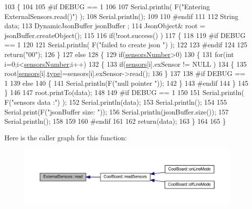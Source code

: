 \begin{DoxyCode}
103 \{
104 
105 \textcolor{preprocessor}{#if DEBUG == 1}
106 
107     Serial.println( F(\textcolor{stringliteral}{"Entering ExternalSensors.read()"}) );
108     Serial.println();
109 
110 \textcolor{preprocessor}{#endif }
111 
112     String data;
113     DynamicJsonBuffer  jsonBuffer ;
114     JsonObject& root = jsonBuffer.createObject();
115 
116     \textcolor{keywordflow}{if}(!root.success() )
117     \{
118  
119 \textcolor{preprocessor}{    #if DEBUG == 1}
120 
121         Serial.println( F(\textcolor{stringliteral}{"failed to create json "}) );
122     
123 \textcolor{preprocessor}{    #endif }
124 
125         \textcolor{keywordflow}{return}(\textcolor{stringliteral}{"00"});
126     \}
127     \textcolor{keywordflow}{else}
128     \{
129         \textcolor{keywordflow}{if}(\hyperlink{class_external_sensors_a58e4fbf9adeae787d92be5fa33043b5d}{sensorsNumber}>0)
130         \{
131             \textcolor{keywordflow}{for}(\textcolor{keywordtype}{int} i=0;i<\hyperlink{class_external_sensors_a58e4fbf9adeae787d92be5fa33043b5d}{sensorsNumber};i++)
132             \{
133                 \textcolor{keywordflow}{if}(\hyperlink{class_external_sensors_a284233f884fcf00154a44740cf1d9e1e}{sensors}[i].exSensor != NULL )
134                 \{
135                     root[\hyperlink{class_external_sensors_a284233f884fcf00154a44740cf1d9e1e}{sensors}[i].\hyperlink{struct_external_sensors_1_1sensor_a6acfdb02c742c2110d7bd2b5d9fce9e7}{type}]=sensors[i].exSensor->read();       
136                 \}
137             
138 \textcolor{preprocessor}{            #if DEBUG == 1}
139                 \textcolor{keywordflow}{else}
140                 \{
141                     Serial.println(F(\textcolor{stringliteral}{"null pointer "}));
142                 \}
143 \textcolor{preprocessor}{            #endif  }
144             \}
145         \}   
146         
147         root.printTo(data);
148     
149 \textcolor{preprocessor}{    #if DEBUG == 1}
150 
151         Serial.println( F(\textcolor{stringliteral}{"sensors data :"}) );
152         Serial.println(data);
153         Serial.println();
154 
155         Serial.print(F(\textcolor{stringliteral}{"jsonBuffer size: "}));
156         Serial.println(jsonBuffer.size());
157         Serial.println();
158 
159     
160 \textcolor{preprocessor}{    #endif}
161     
162         \textcolor{keywordflow}{return}(data);
163     \}
164 
165 \}
\end{DoxyCode}
Here is the caller graph for this function\+:\nopagebreak
\begin{figure}[H]
\begin{center}
\leavevmode
\includegraphics[width=350pt]{d1/d2f/class_external_sensors_a53177b81eca3be89508b5511ddcd00fc_icgraph}
\end{center}
\end{figure}


